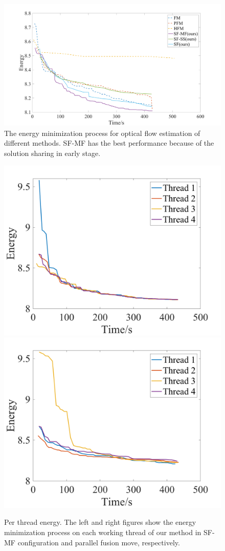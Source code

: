 
\begin{figure}[tb]
  \includegraphics[width=\columnwidth]{figure/optical_flow_convergence.png}
  \caption{The energy minimization process for optical flow estimation of different methods. SF-MF has the best performance because of the solution sharing in early stage.}\label{fig:optical_flow_convergence}
\end{figure}
\begin{figure}[tb]
  \includegraphics[width=0.5\columnwidth]{figure/optical_flow_SF_MF_threads.png}
  \includegraphics[width=0.5\columnwidth]{figure/optical_flow_PFM_threads.png}
  \caption{Per thread energy. The left and right figures show the energy minimization process on each working thread of our method in SF-MF configuration and parallel fusion move, respectively.}\label{fig:optical_flow_by_threads}
\end{figure}
